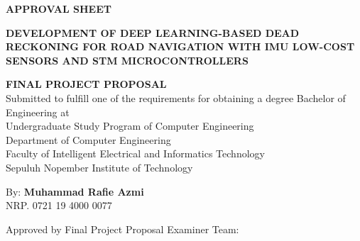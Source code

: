 \begin{center}
	\large
  \textbf{APPROVAL SHEET}
\end{center}

\thispagestyle{empty}

\begin{center}
  \textbf{DEVELOPMENT OF DEEP LEARNING-BASED DEAD RECKONING 
  FOR ROAD NAVIGATION 
  WITH IMU LOW-COST SENSORS AND STM MICROCONTROLLERS}
\end{center}

\begingroup
  \small

  \begin{center}
    \textbf{FINAL PROJECT PROPOSAL} \\
    Submitted to fulfill one of the requirements for obtaining a degree
    Bachelor of Engineering at \\
    Undergraduate Study Program of Computer Engineering \\
    Department of Computer Engineering \\
    Faculty of Intelligent Electrical and Informatics Technology \\
    Sepuluh Nopember Institute of Technology \\
  \end{center}

  \begin{center}
    By: \textbf{Muhammad Rafie Azmi} \\
    NRP. 0721 19 4000 0077
  \end{center}

  \begin{center}
    Approved by Final Project Proposal Examiner Team:
  \end{center}

  \begingroup
    \setlength{\tabcolsep}{0pt}


